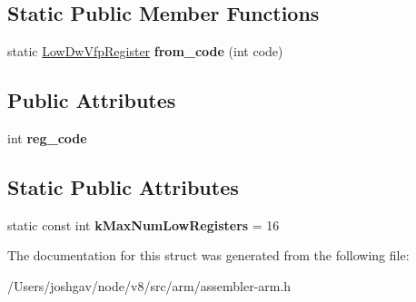 \subsection*{Static Public Member Functions}
\begin{DoxyCompactItemize}
\item 
static \hyperlink{structv8_1_1internal_1_1_low_dw_vfp_register}{Low\+Dw\+Vfp\+Register} {\bfseries from\+\_\+code} (int code)\hypertarget{structv8_1_1internal_1_1_low_dw_vfp_register_a244cf7a04ea25c41c07a54a5dbacaeb5}{}\label{structv8_1_1internal_1_1_low_dw_vfp_register_a244cf7a04ea25c41c07a54a5dbacaeb5}

\end{DoxyCompactItemize}
\subsection*{Public Attributes}
\begin{DoxyCompactItemize}
\item 
int {\bfseries reg\+\_\+code}\hypertarget{structv8_1_1internal_1_1_low_dw_vfp_register_a8f6415937e49772f7f5a78e23e86d397}{}\label{structv8_1_1internal_1_1_low_dw_vfp_register_a8f6415937e49772f7f5a78e23e86d397}

\end{DoxyCompactItemize}
\subsection*{Static Public Attributes}
\begin{DoxyCompactItemize}
\item 
static const int {\bfseries k\+Max\+Num\+Low\+Registers} = 16\hypertarget{structv8_1_1internal_1_1_low_dw_vfp_register_aec67f4d888246109b668bedfb2895cca}{}\label{structv8_1_1internal_1_1_low_dw_vfp_register_aec67f4d888246109b668bedfb2895cca}

\end{DoxyCompactItemize}


The documentation for this struct was generated from the following file\+:\begin{DoxyCompactItemize}
\item 
/\+Users/joshgav/node/v8/src/arm/assembler-\/arm.\+h\end{DoxyCompactItemize}
